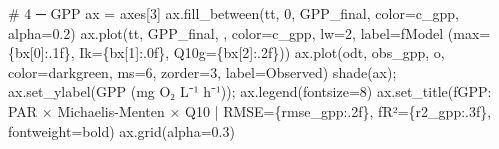 \documentclass[
  letterpaper,
  DIV=11,
  numbers=noendperiod]{scrartcl}
\newenvironment{Shaded}{\begin{snugshade}}{\end{snugshade}}
\newcommand{\CommentTok}[1]{\textcolor[rgb]{0.37,0.37,0.37}{#1}}
\newcommand{\DecValTok}[1]{\textcolor[rgb]{0.68,0.00,0.00}{#1}}
\newcommand{\FloatTok}[1]{\textcolor[rgb]{0.68,0.00,0.00}{#1}}
\newcommand{\NormalTok}[1]{\textcolor[rgb]{0.00,0.23,0.31}{#1}}
\newcommand{\OperatorTok}[1]{\textcolor[rgb]{0.37,0.37,0.37}{#1}}
\newcommand{\SpecialCharTok}[1]{\textcolor[rgb]{0.37,0.37,0.37}{#1}}
\newcommand{\SpecialStringTok}[1]{\textcolor[rgb]{0.13,0.47,0.30}{#1}}
\newcommand{\StringTok}[1]{\textcolor[rgb]{0.13,0.47,0.30}{#1}}
\begin{document}
\begin{Shaded}
\begin{Highlighting}[]
\CommentTok{\# 4 ─ GPP}
\NormalTok{ax }\OperatorTok{=}\NormalTok{ axes[}\DecValTok{3}\NormalTok{]}
\NormalTok{ax.fill\_between(tt, }\DecValTok{0}\NormalTok{, GPP\_final, color}\OperatorTok{=}\NormalTok{c\_gpp, alpha}\OperatorTok{=}\FloatTok{0.2}\NormalTok{)}
\NormalTok{ax.plot(tt, GPP\_final, }\StringTok{\textquotesingle{}{-}\textquotesingle{}}\NormalTok{, color}\OperatorTok{=}\NormalTok{c\_gpp, lw}\OperatorTok{=}\DecValTok{2}\NormalTok{,}
\NormalTok{        label}\OperatorTok{=}\SpecialStringTok{f\textquotesingle{}Model (max=}\SpecialCharTok{\{}\NormalTok{bx[}\DecValTok{0}\NormalTok{]}\SpecialCharTok{:.1f\}}\SpecialStringTok{, Ik=}\SpecialCharTok{\{}\NormalTok{bx[}\DecValTok{1}\NormalTok{]}\SpecialCharTok{:.0f\}}\SpecialStringTok{, Q10g=}\SpecialCharTok{\{}\NormalTok{bx[}\DecValTok{2}\NormalTok{]}\SpecialCharTok{:.2f\}}\SpecialStringTok{)\textquotesingle{}}\NormalTok{)}
\NormalTok{ax.plot(odt, obs\_gpp, }\StringTok{\textquotesingle{}o\textquotesingle{}}\NormalTok{, color}\OperatorTok{=}\StringTok{\textquotesingle{}darkgreen\textquotesingle{}}\NormalTok{, ms}\OperatorTok{=}\DecValTok{6}\NormalTok{, zorder}\OperatorTok{=}\DecValTok{3}\NormalTok{, label}\OperatorTok{=}\StringTok{\textquotesingle{}Observed\textquotesingle{}}\NormalTok{)}
\NormalTok{shade(ax)}\OperatorTok{;}\NormalTok{ ax.set\_ylabel(}\StringTok{\textquotesingle{}GPP (mg O₂ L⁻¹ h⁻¹)\textquotesingle{}}\NormalTok{)}\OperatorTok{;}\NormalTok{ ax.legend(fontsize}\OperatorTok{=}\DecValTok{8}\NormalTok{)}
\NormalTok{ax.set\_title(}\SpecialStringTok{f\textquotesingle{}GPP: PAR × Michaelis{-}Menten × Q10 | RMSE=}\SpecialCharTok{\{}\NormalTok{rmse\_gpp}\SpecialCharTok{:.2f\}}\SpecialStringTok{, \textquotesingle{}}
             \SpecialStringTok{f\textquotesingle{}R²=}\SpecialCharTok{\{}\NormalTok{r2\_gpp}\SpecialCharTok{:.3f\}}\SpecialStringTok{\textquotesingle{}}\NormalTok{, fontweight}\OperatorTok{=}\StringTok{\textquotesingle{}bold\textquotesingle{}}\NormalTok{)}
\NormalTok{ax.grid(alpha}\OperatorTok{=}\FloatTok{0.3}\NormalTok{)}


\end{Highlighting}
\end{Shaded}
\end{document}
